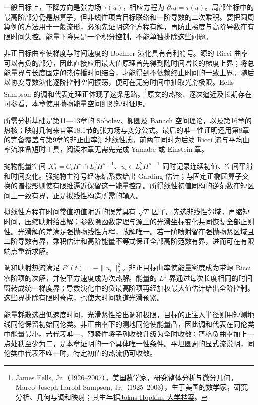 \ProseParagraphBreak
一般目标上，下降方向是张力场 \(\tau(u)\)，相应方程为 \(\partial_tu=\tau(u)\)。局部坐标中的最高阶部分仍是热算子，但非线性项含目标联络和一阶导数的二次乘积。要把圆周算例的方法用于一般流形，必须先证明这个方程有解，再防止梯度与高阶导数在有限时间失控。能量下降只是一个积分控制，不能单独排除这些问题。

\ProseParagraphBreak
非正目标曲率使梯度与时间速度的 Bochner 演化具有有利符号。源的 Ricci 曲率可以有负的部分，因此直接应用最大值原理首先得到随时间增长的梯度上界；将总能量界与长度固定的热传播时间结合，才能得到不依赖终止时间的一致上界。随后以协变导数演化逐阶控制空间振荡，便可在无穷时间中抽取光滑极限。Eells--Sampson 的调和代表定理正体现了这条思路。\footnote{James Eells, Jr.（1926--2007），美国数学家，研究整体分析与微分几何。Marco Joseph Harold Sampson, Jr.（1925--2003），生于美国的数学家，研究分析、几何与调和映射；其生年据\href{https://aspace.library.jhu.edu/repositories/3/resources/801}{Johns Hopkins 大学档案}。}原文的热核、逐次逼近及长期存在可参看\cite[第9--10节，第145--155页]{EellsSampson1964HarmonicMaps}，本章使用抛物能量空间组织短时证明。

\ProseParagraphBreak
所需分析基础是第11—13章的 Sobolev、椭圆及 Banach 空间理论，以及第16章的热核；映射几何来自第18.1节的张力场与变分公式。最后的唯一性证明还用第8章的完备覆盖与第9章的非正曲率测地线性质。前两节同时为后续 Ricci 流与平均曲率流准备短时工具，阅读本章无需先完成 Yamabe 或 Einstein 章。







\begin{chaptersummary}
	抛物能量空间 \(X_T^s=C_tH^s\cap L^2_tH^{s+1}\)、\(u_t\in L^2_tH^{s-1}\) 同时记录连续初值、空间平滑和时间变化。强抛物主符号经冻结系数给出 Gårding 估计；与固定正椭圆算子交换的谱投影则使有限维逼近保留这一能量控制。所得线性初值同构的逆范数在短区间上一致有界，正是拟线性构造所需的输入。

	\ProseParagraphBreak
	拟线性方程在时间常值初值附近的误差具有 \(\sqrt T\) 因子。先选非线性邻域，再缩短时间，压缩映射给出解；参数隐函数定理与源上的光滑坐标变化共同恢复全部正则性。光滑解的差满足强抛物线性方程，故解唯一。若一阶喷射留在强抛物紧区域且二阶导数有界，乘积估计和高阶能量不等式保证全部高阶范数有界，进而可在有限端点重新求解。

	\ProseParagraphBreak
	调和映射热流满足 \(E'(t)=-\|u_t\|_2^2\)。非正目标曲率使能量密度成为带源 Ricci 零阶项的次解，并使平方速度成为次热解。能量的 \(L^1\) 界通过每次长度相同的时间窗转成统一梯度界；导数演化中的负最高阶项再经加权最大值估计给出全阶控制。这些界排除有限时奇点，也使大时间轨道光滑预紧。

	\ProseParagraphBreak
	能量耗散选出低速度时间，光滑紧性给出调和极限，目标的正注入半径则用短测地线同伦保留初始同伦类。非正曲率下的测地同伦使能量凸，因此调和代表在同伦类中能量最小。若代表唯一，预紧性将子列收敛升级为全时收敛；严格负曲率加上一点处秩至少为二，是本章证明的一个具体唯一性条件。平坦圆周的显式流说明，同伦类中代表不唯一时，特定初值的热流仍可收敛。
\end{chaptersummary}

